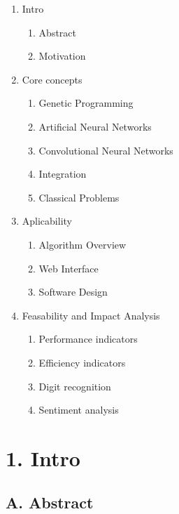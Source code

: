 \documentclass[11pt]{article}
\begin{document}
\begin{enumerate}
\def\labelenumi{\arabic{enumi}.}
\item
  Intro

  \begin{enumerate}
  \def\labelenumii{\arabic{enumii}.}
  \item
    Abstract
  \item
    Motivation
  \end{enumerate}
\item
  Core concepts

  \begin{enumerate}
  \def\labelenumii{\arabic{enumii}.}
  \setcounter{enumii}{2}
  \item
    Genetic Programming
  \item
    Artificial Neural Networks
  \item
    Convolutional Neural Networks
  \item
    Integration
  \item
    Classical Problems
  \end{enumerate}
\item
  Aplicability

  \begin{enumerate}
  \def\labelenumii{\arabic{enumii}.}
  \setcounter{enumii}{7}
  \item
    Algorithm Overview
  \item
    Web Interface
  \item
    Software Design
  \end{enumerate}
\item
  Feasability and Impact Analysis

  \begin{enumerate}
  \def\labelenumii{\arabic{enumii}.}
  \setcounter{enumii}{10}
  \item
    Performance indicators
  \item
    Efficiency indicators
  \item
    Digit recognition
  \item
    Sentiment analysis
  \end{enumerate}
\end{enumerate}

    \hypertarget{intro}{%
\section{1. Intro}\label{intro}}

    \hypertarget{a.-abstract}{%
\subsection{A. Abstract}\label{a.-abstract}}
\end{document}
